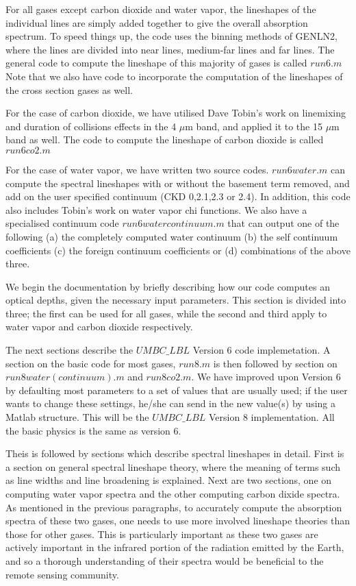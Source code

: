 \documentclass[11pt]{article}
\begin{document}
For all gases except carbon dioxide and water vapor, the lineshapes of the
individual lines are simply added together to give the overall absorption
spectrum. To speed things up, the code uses the binning methods of GENLN2, 
where the lines are divided into near lines, medium-far lines and far 
lines. The general code to compute the lineshape of this majority of gases 
is called $run6.m$ Note that we also have code to incorporate the 
computation of the lineshapes of the cross section gases as well.

For the case of carbon dioxide, we have utilised Dave Tobin's work on 
linemixing and duration of collisions effects in the 4 $\mu$m band, and
applied it to the 15 $\mu$m band as well. The code to compute the lineshape 
of carbon dioxide is called $run6co2.m$

For the case of water vapor, we have written two source codes. $run6water.m$
can compute the spectral lineshapes with or without the basement term removed,
and add on the user specified continuum (CKD 0,2.1,2.3 or 2.4). In addition,
this code also includes Tobin's work on water vapor chi functions. We also
have a specialised continuum code  $run6watercontinuum.m$ that can output one 
of the following (a) the completely computed water continuum (b) the self
continuum coefficients (c) the foreign continuum coefficients or (d) 
combinations of the above three.

We begin the documentation by briefly describing how our code computes an 
optical depths, given the necessary input parameters. This section is 
divided into three; the first can be used for all gases, while the second 
and third apply to water vapor and carbon dioxide respectively.

The next sections describe the $UMBC\_LBL$ Version 6 code implemetation. 
A section on the basic code for most gases, $run8.m$ is then followed by 
section on \\$run8water(continuum).m$ and $run8co2.m$. We have improved upon 
Version 6 by defaulting most parameters to a set of values that are usually 
used; if the user wants to change these settings, he/she can send in the new 
value(s) by using a Matlab structure. This will be the $UMBC\_LBL$ Version 8
implementation. All the basic physics is the same as version 6.

Theis is followed by sections which describe spectral 
lineshapes in detail. First is a section  on general spectral lineshape 
theory, where the meaning of terms such as line widths and line broadening 
is explained. Next are two sections, one on 
computing water vapor spectra and the other computing carbon dixide 
spectra. As mentioned in the previous paragraphs, to accurately compute 
the absorption spectra of these two gases, one needs to use more involved 
lineshape theories than those for other gases. This is particularly 
important as these two gases are actively important in the infrared 
portion of the radiation emitted by the Earth, and so a thorough 
understanding of their spectra would be beneficial to the remote sensing 
community. 
 
\end{document}
